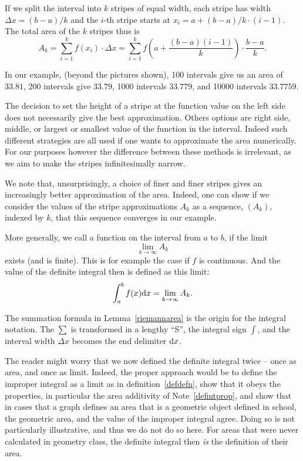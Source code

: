 \begin{lemma}
\label{riemannarea}
If we split the interval into $k$ stripes of equal width, each stripe has
width $\Delta x=(b-a)/k$ and the $i$-th stripe starts at $x_i=a+(b-a)/k\cdot
(i-1)$. The total area of the $k$ stripes thus is
\[
A_k=\sum_{i=1}^k f(x_i)\cdot \Delta x
=\sum_{i=1}^k f\left(a+\frac{(b-a)(i-1)}{k}\right)\cdot\frac{b-a}{k}.
\]
\end{lemma}

In our example, (beyond the pictures shown), 100 intervals give us an area
of $33.81$, 200 intervals give $33.79$, 1000 intervals $33.779$, and 10000
intervals $33.7759$.

\begin{note}
The decision to set the height of a stripe at the function value on the left side does
not necessarily give the best approximation. Others options are right
side, middle, or largest or smallest value of the function in the interval.
Indeed such different strategies are all used if one wants to approximate the
area numerically. For our purposes however the difference between these
methods is irrelevant, as we aim to make the stripes infinitesimally narrow.
\end{note}

We note that, unsurprisingly, a choice of finer and finer stripes gives an
increasingly better approximation of the area. Indeed, one can show if we
consider the values of the stripe approximations $A_k$ as a sequence,
$(A_k)$, indexed by $k$, that this sequence converges in our example.

\begin{defn}
\label{defdefn}
More generally, we call a function  on the interval from
$a$ to $b$, if the limit
\[
\lim_{k\to\infty} A_k
\]
exists (and is finite). This is for example the case if $f$ is continuous.
And the value of the definite integral then is defined as this limit:
\[
\int_a^b f(x){\mbox{d}}x=\lim_{k\to\infty} A_k.
\]
\end{defn}
\begin{note}
The summation formula in Lemma~\ref{riemannarea} is the origin for the integral
notation. The $\sum$ is transformed in a lengthy ``S'', the integral sign
$\int$, and the interval width $\Delta x$ becomes the end delimiter
${\mbox{d}}x$.
\end{note}

\begin{note}
The reader might worry that we now defined the definite integral twice -- once as
area, and once as limit. Indeed, the proper approach would be to define the
improper integral as a limit as in definition~\ref{defdefn}, show that it obeys
the properties, in particular the area additivity of Note~\ref{defintprop}, and
show that in cases that a graph defines an area that is a geometric object defined
in school, the geometric area, and the value of the improper integral agree. Doing
so is not particularly illustrative, and thus we do not do so here.
For areas that were never calculated in geometry class, the definite integral then
{\em is} the definition of their area.
\end{note}

